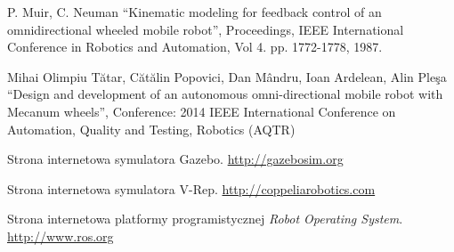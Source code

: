 \begin{thebibliography}{0}

 P. Muir, C. Neuman ``Kinematic modeling for feedback control of an omnidirectional wheeled mobile robot'', 
 Proceedings, IEEE International Conference in Robotics and Automation, 
 Vol 4. pp. 1772-1778, 1987.

Mihai Olimpiu Tătar, Cătălin Popovici, Dan Mândru, Ioan Ardelean, Alin Pleşa ``Design and development of an autonomous omni-directional mobile robot with Mecanum wheels'',
Conference: 2014 IEEE International Conference on Automation, Quality and Testing, Robotics (AQTR)

Strona internetowa symulatora Gazebo.
\url{http://gazebosim.org}

Strona internetowa symulatora V-Rep.
\url{http://coppeliarobotics.com}

Strona internetowa platformy programistycznej \emph{Robot Operating System}.
\url{http://www.ros.org}

\end{thebibliography}